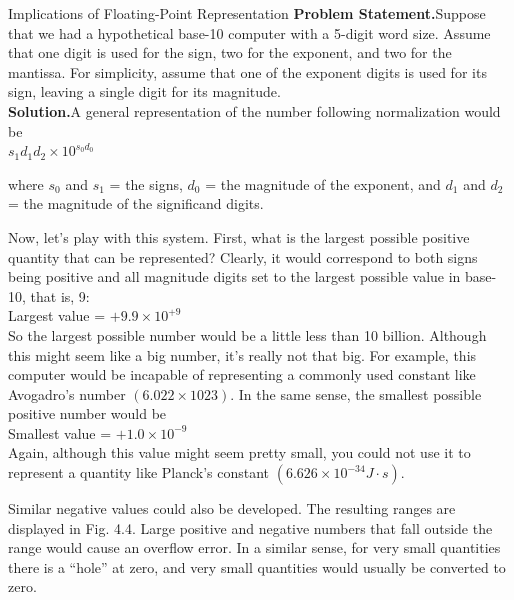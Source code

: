 \documentclass[../main.tex]{subfiles}
\begin{document}
\begin{example} Implications of Floating-Point Representation
    \bigskip
    \newline
    \textbf{Problem Statement.}\quad Suppose that we had a hypothetical base-10 computer with a 5-digit
    word size. Assume that one digit is used for the sign, two for the exponent, and two for the
    mantissa. For simplicity, assume that one of the exponent digits is used for its sign, leaving
    a single digit for its magnitude.\\

    \noindent
    \textbf{Solution.}\quad A general representation of the number following normalization would be\\

    $s_1 d_1 d_2 \times 10^{s_0 d_0}$
    \newpage

    \noindent
    where $s_0$ and $s_1$ = the signs, $d_0$ = the magnitude of the exponent, and $d_1$ and $d_2$ = the magnitude
    of the significand digits.

    Now, let's play with this system. First, what is the largest possible positive quantity
    that can be represented? Clearly, it would correspond to both signs being positive and all
    magnitude digits set to the largest possible value in base-10, that is, 9:\\

    Largest value = $+9.9\times10^{+9}$\\

    \noindent
    So the largest possible number would be a little less than 10 billion. Although this might
    seem like a big number, it's really not that big. For example, this computer would be incapable
    of representing a commonly used constant like Avogadro's number $(6.022 \times 1023)$.
    In the same sense, the smallest possible positive number would be\\

    Smallest value = $+1.0 \times 10^{-9}$\\

    \noindent
    Again, although this value might seem pretty small, you could not use it to represent a
    quantity like Planck's constant $(6.626 \times 10^{-34} J \cdot s)$.
    
    Similar negative values could also be developed. The resulting ranges are displayed in
    Fig. 4.4. Large positive and negative numbers that fall outside the range would cause an
    overflow error. In a similar sense, for very small quantities there is a ``hole'' at zero, and
    very small quantities would usually be converted to zero.
    

\end{example}
\end{document}
